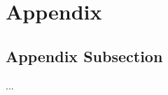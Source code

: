 \section{Appendix}
\setcounter{secnumdepth}{3}
\renewcommand{\thesubsection}{\Alph{subsection}}
\label{app:an-appendix}
\renewcommand{\arraystretch}{1}
\subsection{Appendix Subsection}
\label{app:subsec}

...